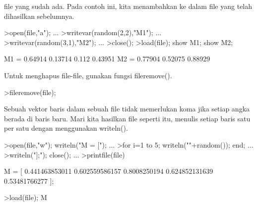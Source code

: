 \documentclass[12pt,arial,letterpaper]{book}
\begin{document}
\begin{eulercomment}
\begin{eulercomment}
\begin{eulercomment}
\begin{eulercomment}
\begin{eulercomment}
\begin{eulercomment}
\begin{eulercomment}
\begin{eulercomment}
\begin{eulercomment}
\begin{eulercomment}
\begin{eulercomment}
\begin{eulercomment}
\begin{eulercomment}
\begin{eulercomment}
\begin{eulercomment}
\begin{eulercomment}
\begin{eulercomment}
\begin{eulercomment}
\begin{eulercomment}
\begin{eulercomment}
\begin{eulercomment}
\begin{eulercomment}
\begin{eulercomment}
\begin{eulercomment}
\begin{eulercomment}
\begin{eulercomment}
\begin{eulercomment}
\begin{eulercomment}
\begin{eulercomment}
\begin{eulercomment}
\begin{eulercomment}
\begin{eulercomment}
\begin{eulercomment}
\begin{eulercomment}
\begin{eulercomment}
\begin{eulercomment}
\begin{eulercomment}
\begin{eulercomment}
\begin{eulercomment}
file yang sudah ada. Pada contoh ini, kita menambahkan ke dalam file
yang telah dihasilkan sebelumnya.
\end{eulercomment}
\begin{eulerprompt}
>open(file,"a"); ...
>writevar(random(2,2),"M1"); ...
>writevar(random(3,1),"M2"); ...
>close();
>load(file); show M1; show M2;
\end{eulerprompt}
\begin{euleroutput}
  M1 = 
    0.64914   0.13714 
      0.112   0.43951 
  M2 = 
    0.77904 
    0.52075 
    0.88929 
\end{euleroutput}
\begin{eulercomment}
Untuk menghapus file-file, gunakan fungsi fileremove().
\end{eulercomment}
\begin{eulerprompt}
>fileremove(file);
\end{eulerprompt}
\begin{eulercomment}
Sebuah vektor baris dalam sebuah file tidak memerlukan koma jika
setiap angka berada di baris baru. Mari kita hasilkan file seperti
itu, menulis setiap baris satu per satu dengan menggunakan writeln().
\end{eulercomment}
\begin{eulerprompt}
>open(file,"w"); writeln("M = ["); ...
>for i=1 to 5; writeln(""+random()); end; ...
>writeln("];"); close(); ...
>printfile(file)
\end{eulerprompt}
\begin{euleroutput}
  M = [
  0.441463853011
  0.602559586157
  0.8008250194
  0.624852131639
  0.53481766277
  ];
\end{euleroutput}
\begin{eulerprompt}
>load(file); M
\end{eulerprompt}

\end{eulercomment}
\end{eulercomment}
\end{eulercomment}
\end{eulercomment}
\end{eulercomment}
\end{eulercomment}
\end{eulercomment}
\end{eulercomment}
\end{eulercomment}
\end{eulercomment}
\end{eulercomment}
\end{eulercomment}
\end{eulercomment}
\end{eulercomment}
\end{eulercomment}
\end{eulercomment}
\end{eulercomment}
\end{eulercomment}
\end{eulercomment}
\end{eulercomment}
\end{eulercomment}
\end{eulercomment}
\end{eulercomment}
\end{eulercomment}
\end{eulercomment}
\end{eulercomment}
\end{eulercomment}
\end{eulercomment}
\end{eulercomment}
\end{eulercomment}
\end{eulercomment}
\end{eulercomment}
\end{eulercomment}
\end{eulercomment}
\end{eulercomment}
\end{eulercomment}
\end{eulercomment}
\end{eulercomment}
\end{document}
